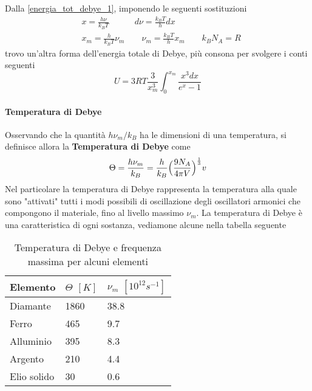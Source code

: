 Dalla \ref{energia_tot_debye_1}, imponendo le seguenti sostituzioni 
\begin{equation}
\begin{split}
& x = \frac{h\nu}{k_B T} \quad\quad\quad d\nu = \frac{k_B T}{h} dx \\
& x_m = \frac{h}{k_B T} \nu_m \quad\quad \nu_m = \frac{k_B T}{h} x_m \quad\quad k_B N_A = R
\label{sostituzioni}
\end{split}
\end{equation}
trovo un'altra forma dell'energia totale di Debye, più consona per svolgere i conti seguenti
\begin{equation}
U = 3 R T \frac{3}{x_m^3} \int_0^{x_m}  \frac{x^3 dx}{e^x-1}
\label{energia_tot_debye_2}
\end{equation}

\paragraph{Temperatura di Debye}
Osservando che la quantità $h \nu_m / k_B$ ha le dimensioni di una temperatura, si definisce allora la \textbf{Temperatura di Debye} come
\begin{equation}
\Theta = \frac{h \nu_m}{k_B} = \frac{h}{k_B} \Bigl(  \frac{9 N_A}{4 \pi V}  \Bigr)^{ \frac{1}{3} } v
\label{temp_debye}
\end{equation}
Nel particolare la temperatura di Debye rappresenta la temperatura alla quale sono "attivati" tutti i modi possibili di oscillazione degli oscillatori armonici che compongono il materiale, fino al livello massimo $\nu_m$.
La temperatura di Debye è una caratteristica di ogni sostanza, vediamone alcune nella tabella seguente
\begin{table}[h]
\centering
\begin{tabular}{lll}
\hline
\textbf{Elemento} \quad\quad & \textbf{$\Theta$  $[K]$} \quad\quad & \textbf{$\nu_m$  $[10^{12} s^{-1}]$} \\ \hline
Diamante & 1860 & 38.8 \\
Ferro & 465 & 9.7 \\
Alluminio & 395 & 8.3 \\
Argento & 210 & 4.4 \\
Elio solido & 30 & 0.6 \\ \hline
\end{tabular}
\caption{Temperatura di Debye e frequenza massima per alcuni elementi}
\end{table}

